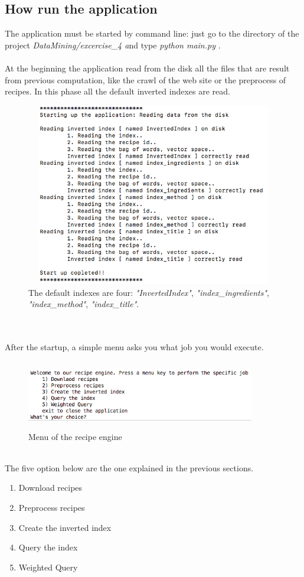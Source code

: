 \documentclass[oneside]{article}			%
\begin{document}
	\subsection{How run the application}
		The application must be started by command line: just go to the directory of the project \textit{DataMining/excercise\_4 a}nd type \textit{python main.py} .
		\\\\
		At the beginning the application read from the disk all the files that are result from previous computation, like the crawl of the web site or the preprocess of recipes. In this phase all the default inverted indexes are read.
		\begin{figure}[h]
			\includegraphics[width=12cm, height=8cm]{./report_file/app/startup.png}\caption{The default indexes are four: \textit{"InvertedIndex"}, \textit{"index\_ingredients"}, \textit{"index\_method"}, \textit{"index\_title"}.}
		\end{figure}
		\\\\
		After the startup, a simple menu asks you what job you would execute.
		\begin{figure}[h]
			\includegraphics[width=10cm, height=3cm]{./report_file/app/menu.png}\caption{Menu of the recipe engine}
		\end{figure}
		\\
		The five option below are the one explained in the previous sections.
		\begin{enumerate}[label=\arabic*.]
			\item Download recipes
			\item Preprocess recipes
			\item Create the inverted index
			\item Query the index
			\item Weighted Query
		\end{enumerate}
\end{document}
